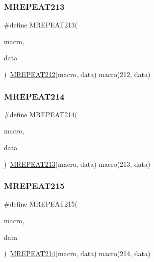 \mbox{\label{group__group__sam0__utils__mrepeat_gaccb21a4853dfcaf0709211bfb7bd8671}} 
\subsubsection{\texorpdfstring{MREPEAT213}{MREPEAT213}}
{\footnotesize\ttfamily \#define M\+R\+E\+P\+E\+A\+T213(\begin{DoxyParamCaption}\item[{}]{macro,  }\item[{}]{data }\end{DoxyParamCaption})~\mbox{\hyperlink{group__group__sam0__utils__mrepeat_gad82f46aaf9a5b824c91394754824d66d}{M\+R\+E\+P\+E\+A\+T212}}(macro, data)   macro(212, data)}

\mbox{\label{group__group__sam0__utils__mrepeat_ga7dc8e4f802d149970b11ab09ee582aca}} 
\subsubsection{\texorpdfstring{MREPEAT214}{MREPEAT214}}
{\footnotesize\ttfamily \#define M\+R\+E\+P\+E\+A\+T214(\begin{DoxyParamCaption}\item[{}]{macro,  }\item[{}]{data }\end{DoxyParamCaption})~\mbox{\hyperlink{group__group__sam0__utils__mrepeat_gaccb21a4853dfcaf0709211bfb7bd8671}{M\+R\+E\+P\+E\+A\+T213}}(macro, data)   macro(213, data)}

\mbox{\label{group__group__sam0__utils__mrepeat_gae2a73793b6f0682b5b209181a2cce5c3}} 
\subsubsection{\texorpdfstring{MREPEAT215}{MREPEAT215}}
{\footnotesize\ttfamily \#define M\+R\+E\+P\+E\+A\+T215(\begin{DoxyParamCaption}\item[{}]{macro,  }\item[{}]{data }\end{DoxyParamCaption})~\mbox{\hyperlink{group__group__sam0__utils__mrepeat_ga7dc8e4f802d149970b11ab09ee582aca}{M\+R\+E\+P\+E\+A\+T214}}(macro, data)   macro(214, data)}

